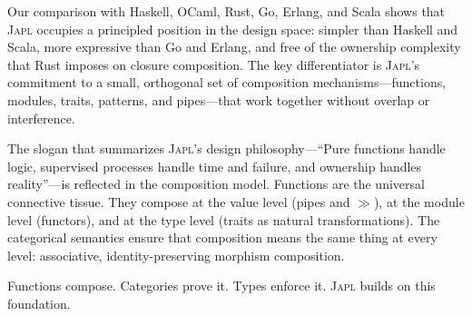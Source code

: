 \documentclass[11pt,a4paper]{article}
\newcommand{\japl}{\textsc{Japl}}
\begin{document}
Our comparison with Haskell, OCaml, Rust, Go, Erlang, and Scala shows that \japl{} occupies a principled position in the design space: simpler than Haskell and Scala, more expressive than Go and Erlang, and free of the ownership complexity that Rust imposes on closure composition. The key differentiator is \japl{}'s commitment to a small, orthogonal set of composition mechanisms---functions, modules, traits, patterns, and pipes---that work together without overlap or interference.

The slogan that summarizes \japl{}'s design philosophy---``Pure functions handle logic, supervised processes handle time and failure, and ownership handles reality''---is reflected in the composition model. Functions are the universal connective tissue. They compose at the value level (pipes and $\gg$), at the module level (functors), and at the type level (traits as natural transformations). The categorical semantics ensure that composition means the same thing at every level: associative, identity-preserving morphism composition.

Functions compose. Categories prove it. Types enforce it. \japl{} builds on this foundation.



\end{document}
